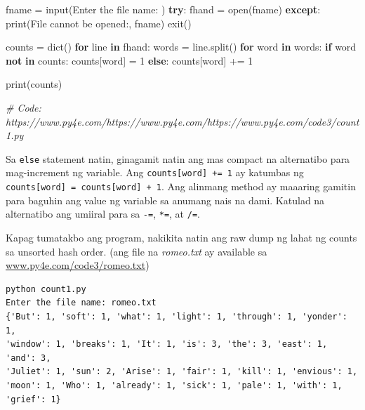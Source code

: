 \documentclass[10pt,]{book}
\newenvironment{Shaded}{}{}
\newcommand{\BuiltInTok}[1]{\textcolor[rgb]{0.00,0.50,0.00}{#1}}
\newcommand{\CommentTok}[1]{\textcolor[rgb]{0.38,0.63,0.69}{\textit{#1}}}
\newcommand{\ControlFlowTok}[1]{\textcolor[rgb]{0.00,0.44,0.13}{\textbf{#1}}}
\newcommand{\DecValTok}[1]{\textcolor[rgb]{0.25,0.63,0.44}{#1}}
\newcommand{\KeywordTok}[1]{\textcolor[rgb]{0.00,0.44,0.13}{\textbf{#1}}}
\newcommand{\NormalTok}[1]{#1}
\newcommand{\OperatorTok}[1]{\textcolor[rgb]{0.40,0.40,0.40}{#1}}
\newcommand{\StringTok}[1]{\textcolor[rgb]{0.25,0.44,0.63}{#1}}
\begin{document}
\begin{Shaded}
\begin{Highlighting}[]
\NormalTok{fname }\OperatorTok{=} \BuiltInTok{input}\NormalTok{(}\StringTok{\textquotesingle{}Enter the file name: \textquotesingle{}}\NormalTok{)}
\ControlFlowTok{try}\NormalTok{:}
\NormalTok{    fhand }\OperatorTok{=} \BuiltInTok{open}\NormalTok{(fname)}
\ControlFlowTok{except}\NormalTok{:}
    \BuiltInTok{print}\NormalTok{(}\StringTok{\textquotesingle{}File cannot be opened:\textquotesingle{}}\NormalTok{, fname)}
\NormalTok{    exit()}

\NormalTok{counts }\OperatorTok{=} \BuiltInTok{dict}\NormalTok{()}
\ControlFlowTok{for}\NormalTok{ line }\KeywordTok{in}\NormalTok{ fhand:}
\NormalTok{    words }\OperatorTok{=}\NormalTok{ line.split()}
    \ControlFlowTok{for}\NormalTok{ word }\KeywordTok{in}\NormalTok{ words:}
        \ControlFlowTok{if}\NormalTok{ word }\KeywordTok{not} \KeywordTok{in}\NormalTok{ counts:}
\NormalTok{            counts[word] }\OperatorTok{=} \DecValTok{1}
        \ControlFlowTok{else}\NormalTok{:}
\NormalTok{            counts[word] }\OperatorTok{+=} \DecValTok{1}

\BuiltInTok{print}\NormalTok{(counts)}

\CommentTok{\# Code: https://www.py4e.com/https://www.py4e.com/https://www.py4e.com/code3/count1.py}
\end{Highlighting}
\end{Shaded}


Sa \texttt{else} statement natin, ginagamit natin ang mas compact na
alternatibo para mag-increment ng variable. Ang
\texttt{counts{[}word{]}\ +=\ 1} ay katumbas ng
\texttt{counts{[}word{]}\ =\ counts{[}word{]}\ +\ 1}. Ang alinmang
method ay maaaring gamitin para baguhin ang value ng variable sa anumang
nais na dami. Katulad na alternatibo ang umiiral para sa \texttt{-=},
\texttt{*=}, at \texttt{/=}.

Kapag tumatakbo ang program, nakikita natin ang raw dump ng lahat ng
counts sa unsorted hash order. (ang file na \emph{romeo.txt} ay
available sa
\href{http://www.py4e.com/code3/romeo.txt}{www.py4e.com/code3/romeo.txt})

{\small
\begin{verbatim}
python count1.py
Enter the file name: romeo.txt
{'But': 1, 'soft': 1, 'what': 1, 'light': 1, 'through': 1, 'yonder': 1,
'window': 1, 'breaks': 1, 'It': 1, 'is': 3, 'the': 3, 'east': 1, 'and': 3,
'Juliet': 1, 'sun': 2, 'Arise': 1, 'fair': 1, 'kill': 1, 'envious': 1,
'moon': 1, 'Who': 1, 'already': 1, 'sick': 1, 'pale': 1, 'with': 1,
'grief': 1}
\end{verbatim}
}
\end{document}
